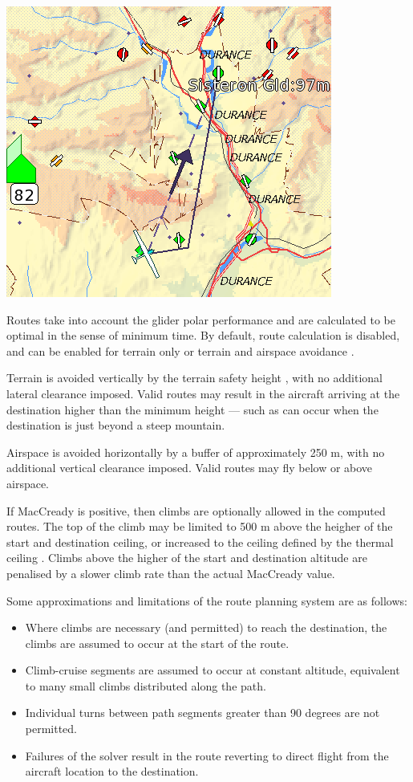 \begin{center}
\includegraphics[angle=0,width=0.8\linewidth,keepaspectratio='true']{figures/route3.png}
\end{center}

Routes take into account the glider polar performance and are
calculated to be optimal in the sense of minimum time.  By default,
route calculation is disabled, and can be enabled for terrain only or
terrain and airspace avoidance .

Terrain is avoided vertically by the terrain safety height
, with no additional lateral clearance imposed.
Valid routes may result in the aircraft arriving at the destination
higher than the minimum height --- such as can occur when the
destination is just beyond a steep mountain.

Airspace is avoided horizontally by a buffer of approximately 250 m,
with no additional vertical clearance imposed.  Valid routes may fly
below or above airspace.

If MacCready is positive, then climbs are optionally allowed
 in the computed routes.  The top of the climb
may be limited to 500 m above the heigher of the start and destination
ceiling, or increased to the ceiling defined by the thermal ceiling
.  Climbs above the higher of the start and
destination altitude are penalised by a slower climb rate than the
actual MacCready value.

Some approximations and limitations of the route planning system are as follows:
\begin{itemize}
\item Where climbs are necessary (and permitted) to reach the destination,
the climbs are assumed to occur at the start of the route.
\item Climb-cruise segments are assumed to occur at constant altitude,
equivalent to many small climbs distributed along the path.
\item Individual turns between path segments greater than 90 degrees
  are not permitted.
\item Failures of the solver result in the route reverting to direct flight
from the aircraft location to the destination.
\end{itemize}

